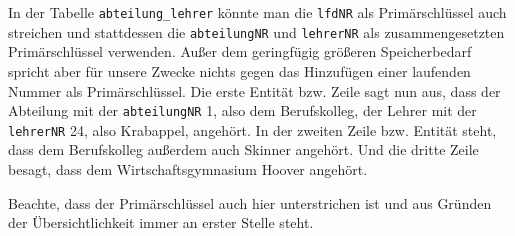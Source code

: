 In der Tabelle \lstinline!abteilung_lehrer! könnte man die \lstinline!lfdNR! als Primärschlüssel auch streichen und stattdessen die \lstinline!abteilungNR! und \lstinline!lehrerNR! als zusammengesetzten Primärschlüssel verwenden. Außer dem geringfügig größeren Speicherbedarf spricht aber für unsere Zwecke nichts gegen das Hinzufügen einer laufenden Nummer als Primärschlüssel. Die erste Entität bzw. Zeile sagt nun aus, dass der Abteilung mit der \lstinline!abteilungNR! 1, also dem Berufskolleg, der Lehrer mit der \lstinline!lehrerNR! 24, also Krabappel, angehört. In der zweiten Zeile bzw. Entität steht, dass dem Berufskolleg außerdem auch Skinner angehört. Und die dritte Zeile besagt, dass dem Wirtschaftsgymnasium Hoover angehört.

Beachte, dass der Primärschlüssel auch hier unterstrichen ist und aus Gründen der Übersichtlichkeit immer an erster Stelle steht.
\begin{Exercise}[title=Erstelle zu den ERMs aus Aufgabe \ref{ERMErstellen1} passende Tabellen., label=TabelleErstellen1]

\end{Exercise}
